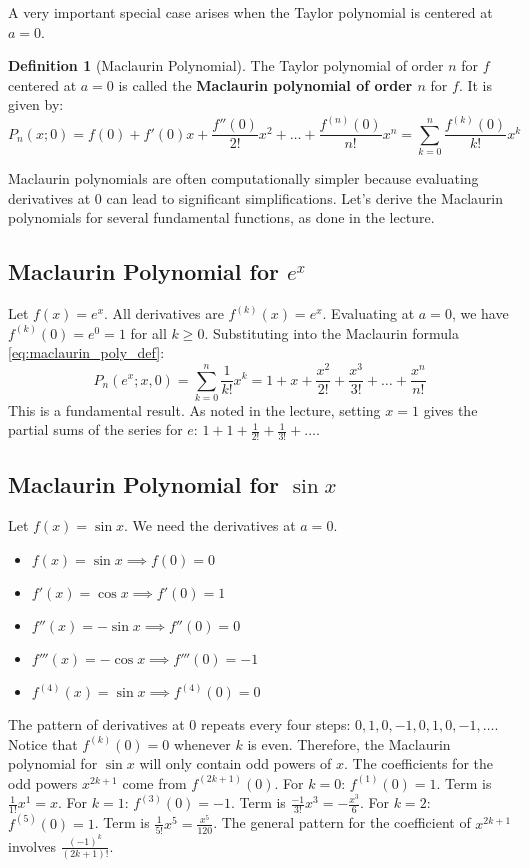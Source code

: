 \documentclass[11pt]{article}
\theoremstyle{definition}
\newtheorem{definition}[theorem]{Definition}
\theoremstyle{remark}
\begin{document}
A very important special case arises when the Taylor polynomial is centered at $a=0$.

\begin{definition}[Maclaurin Polynomial]
The Taylor polynomial of order $n$ for $f$ centered at $a=0$ is called the \textbf{Maclaurin polynomial of order $n$} for $f$. It is given by:
\begin{equation} \label{eq:maclaurin_poly_def}
P_n(x; 0) = f(0) + f'(0)x + \frac{f''(0)}{2!}x^2 + \dots + \frac{f^{(n)}(0)}{n!}x^n = \sum_{k=0}^n \frac{f^{(k)}(0)}{k!}x^k
\end{equation}
\end{definition}

Maclaurin polynomials are often computationally simpler because evaluating derivatives at $0$ can lead to significant simplifications. Let's derive the Maclaurin polynomials for several fundamental functions, as done in the lecture.

\subsection{Maclaurin Polynomial for \texorpdfstring{$e^x$}{exp(x)}}
Let $f(x) = e^x$. All derivatives are $f^{(k)}(x) = e^x$.
Evaluating at $a=0$, we have $f^{(k)}(0) = e^0 = 1$ for all $k \ge 0$.
Substituting into the Maclaurin formula \eqref{eq:maclaurin_poly_def}:
\[ P_n(e^x; x, 0) = \sum_{k=0}^n \frac{1}{k!}x^k = 1 + x + \frac{x^2}{2!} + \frac{x^3}{3!} + \dots + \frac{x^n}{n!} \]
This is a fundamental result. As noted in the lecture, setting $x=1$ gives the partial sums of the series for $e$: $1 + 1 + \frac{1}{2!} + \frac{1}{3!} + \dots$.

\subsection{Maclaurin Polynomial for \texorpdfstring{$\sin x$}{sin(x)}}
Let $f(x) = \sin x$. We need the derivatives at $a=0$.
\begin{itemize}
    \item $f(x) = \sin x \implies f(0) = 0$
    \item $f'(x) = \cos x \implies f'(0) = 1$
    \item $f''(x) = -\sin x \implies f''(0) = 0$
    \item $f'''(x) = -\cos x \implies f'''(0) = -1$
    \item $f^{(4)}(x) = \sin x \implies f^{(4)}(0) = 0$
\end{itemize}
The pattern of derivatives at 0 repeats every four steps: $0, 1, 0, -1, 0, 1, 0, -1, \dots$.
Notice that $f^{(k)}(0) = 0$ whenever $k$ is even. Therefore, the Maclaurin polynomial for $\sin x$ will only contain odd powers of $x$.
The coefficients for the odd powers $x^{2k+1}$ come from $f^{(2k+1)}(0)$.
For $k=0$: $f^{(1)}(0)=1$. Term is $\frac{1}{1!}x^1 = x$.
For $k=1$: $f^{(3)}(0)=-1$. Term is $\frac{-1}{3!}x^3 = -\frac{x^3}{6}$.
For $k=2$: $f^{(5)}(0)=1$. Term is $\frac{1}{5!}x^5 = \frac{x^5}{120}$.
The general pattern for the coefficient of $x^{2k+1}$ involves $\frac{(-1)^k}{(2k+1)!}$.
\end{document}
